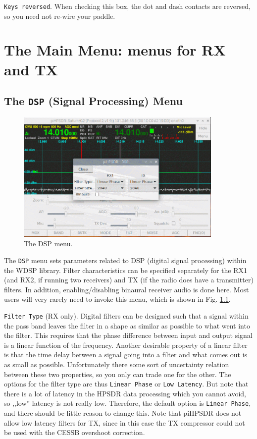 \documentclass[12pt]{book}
\def\rett#1{\texttt{\color{red}#1}}
\def\bltt#1{\texttt{\color{blue}#1}}
\def\pH{pi\-HPSDR }
\begin{document}
\rett{Keys reversed}. When checking this box, the dot and dash contacts
are reversed, so you need not re-wire your paddle.


\chapter[Menus for RX and TX]{The Main Menu: menus for RX and TX}

\section{The \texttt{DSP} (Signal Processing) Menu}

\begin{figure}[ht]
\center
\includegraphics[width=10cm]{DSPMenu.png}
\caption{The DSP menu.}
\label{fig:DSPMenu}
\end{figure}

The \bltt{DSP} menu sets parameters related to DSP (digital signal processing)
within the WDSP library.
Filter characteristics can be specified separately for the RX1 (and RX2, if
running two receivers) and TX (if the radio does have a transmitter)
filters. In addition, enabling/disabling binaural receiver audio
is done here.  Most users will
very rarely need to invoke this menu, which is shown
in Fig. \ref{fig:DSPMenu}.

\rett{Filter Type} (RX only). Digital filters can be designed such that a signal within the
pass band leaves the filter in a shape as similar as possible
to what went into the filter. This requires that the phase
difference between input and output signal is a linear
function of the frequency. Another desirable property
of a linear filter is that the time delay between a signal
going into a filter and what comes out is as small as
possible. Unfortunately there some sort of uncertainty
relation between these two properties, so you only can
trade one for the other. The options for the filter type
are thus \rett{Linear Phase} or \rett{Low Latency}.
But note that there is a lot of latency in the HPSDR data
processing which you cannot avoid, so ,,low'' latency
is not really low. Therefore, the default option
is \rett{Linear Phase}, and there should be little reason
to change this. Note that \pH does not allow low latency
filters for TX, since in this case the TX compressor
could not be used with the CESSB overshoot correction.
\end{document}
